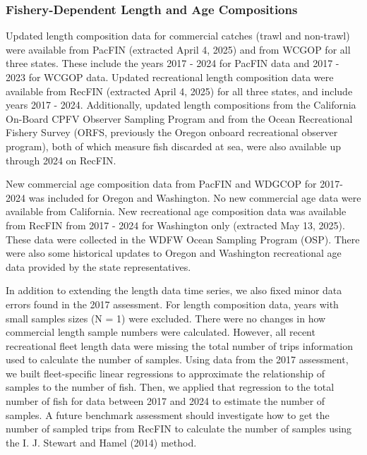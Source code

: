 \documentclass[
]{scrartcl}
\begin{document}
\subsubsection{Fishery-Dependent Length and Age
Compositions}\label{sec-fd_comps}

Updated length composition data for commercial catches (trawl and
non-trawl) were available from PacFIN (extracted April 4, 2025) and from
WCGOP for all three states. These include the years 2017 - 2024 for
PacFIN data and 2017 - 2023 for WCGOP data. Updated recreational length
composition data were available from RecFIN (extracted April 4, 2025)
for all three states, and include years 2017 - 2024. Additionally,
updated length compositions from the California On-Board CPFV Observer
Sampling Program and from the Ocean Recreational Fishery Survey (ORFS,
previously the Oregon onboard recreational observer program), both of
which measure fish discarded at sea, were also available up through 2024
on RecFIN.

New commercial age composition data from PacFIN and WDGCOP for 2017-2024
was included for Oregon and Washington. No new commercial age data were
available from California. New recreational age composition data was
available from RecFIN from 2017 - 2024 for Washington only (extracted
May 13, 2025). These data were collected in the WDFW Ocean Sampling
Program (OSP). There were also some historical updates to Oregon and
Washington recreational age data provided by the state representatives.

In addition to extending the length data time series, we also fixed
minor data errors found in the 2017 assessment. For length composition
data, years with small samples sizes (N = 1) were excluded. There were
no changes in how commercial length sample numbers were calculated.
However, all recent recreational fleet length data were missing the
total number of trips information used to calculate the number of
samples. Using data from the 2017 assessment, we built fleet-specific
linear regressions to approximate the relationship of samples to the
number of fish. Then, we applied that regression to the total number of
fish for data between 2017 and 2024 to estimate the number of samples. A
future benchmark assessment should investigate how to get the number of
sampled trips from RecFIN to calculate the number of samples using the
I. J. Stewart and Hamel (2014) method.
\end{document}
